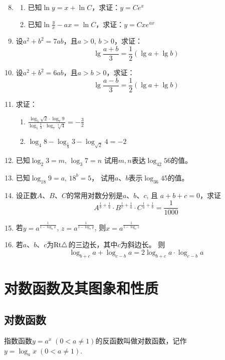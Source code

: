 \begin{enumerate}\setcounter{enumi}{7}
    \item \begin{enumerate}[(1)]
        \item 已知$\ln y=x+\ln C$，求证：$y=Ce^x$
        \item 已知$\ln\frac{y}{x}-ax=\ln C$，求证：$y=Cxe^{ax}$
    \end{enumerate}


\item 设$a^2+b^2=7ab$，且$a>0$, $b>0$，求证：
\[\lg\frac{a+b}{3}=\frac{1}{2}(\lg a+\lg b)\]
\item 设$a^2+b^2=6ab$，且$a>b>0$，求证：
\[\lg\frac{a-b}{3}=\frac{1}{2}(\lg a+\lg b)\]
\item 求证：
\begin{multicols}{2}
 \begin{enumerate}[(1)]
    \item $\frac{\log_5 \sqrt{2}\cdot \log_7 9}{\log_5 \frac{1}{3}\cdot \log_7 \sqrt[3]{4}}=-\frac{3}{2}$
    \item $\log_4 8-\log_{\tfrac{1}{9}}3-\log_{\sqrt{2}}4=-2$
\end{enumerate}   
\end{multicols}

\item 已知$\log_2 3=m$, $\log_3 7=n$
试用$m,n$表达$\log_{42}56$的值。
\item 已知$\log_{18}9=a$, $18^b=5$，
试用$a$、$b$表示$\log_{36}45$的值。
\item 设正数$A$、$B$、$C$的常用对数分别是$a$、$b$、$c$, 且
$a+b+c=0$，求证
\[A^{\tfrac{1}{b}+\tfrac{1}{a}}\cdot B^{\tfrac{1}{c}+\tfrac{1}{a}}\cdot C^{\tfrac{1}{a}+\tfrac{1}{b}}=\frac{1}{1000}\]
\item 若$y=a^{\tfrac{1}{1-\log_a x}}$, $z=a^{\tfrac{1}{1-\log_a y}}$, 则$x=a^{\tfrac{1}{1-\log_a z}}$

\item 若$a$、$b$、$c$为${\rm Rt}\triangle$的三边长，其中$c$为斜边长。
则
\[\log_{b+c}a+\log_{c-b}a=2\log_{b+c} a\cdot \log_{c-b} a\]
\end{enumerate}


\section{对数函数及其图象和性质}

\subsection{对数函数}
指数函数$y=a^x\; (0<a\ne 1)$的反函数叫做对数函数，记作$y=\log_a x\; (0<a\ne 1)$.

